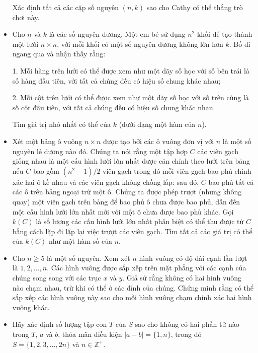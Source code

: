 \documentclass[11pt]{scrartcl}
\begin{document}
\begin{itemize}[label=, leftmargin=0em, itemsep=-0em]
\begin{btvn}
        Xác định tất cả các cặp số nguyên \( (n,k) \) sao cho Cathy có thể thắng trò chơi này.

    \end{btvn}
    \item \begin{btvn}
        Cho \( n \) và \( k \) là các số nguyên dương. Một em bé sử dụng \( n^2 \) khối để tạo thành một lưới \( n \times n \), với mỗi khối có một số nguyên dương không lớn hơn \( k \). Bố đi ngang qua và nhận thấy rằng:

        1. Mỗi hàng trên lưới có thể được xem như một dãy số học với số bên trái là số hàng đầu tiên, với tất cả chúng đều có hiệu số chung khác nhau;
        
        2. Mỗi cột trên lưới có thể được xem như một dãy số học với số trên cùng là số cột đầu tiên, với tất cả chúng đều có hiệu số chung khác nhau.

        Tìm giá trị nhỏ nhất có thể của \( k \) (dưới dạng một hàm của \( n \)).

    \end{btvn}
    \item \begin{btvn}
        Xét một bảng ô vuông $n \times n$ được tạo bởi các ô vuông đơn vị với $n$ là một số nguyên lẻ dương nào đó. Chúng ta nói rằng một tập hợp $C$ các viên gạch giống nhau là một cấu hình lưới lớn nhất được căn chỉnh theo lưới trên bảng nếu $C$ bao gồm $(n^2-1)/2$ viên gạch trong đó mỗi viên gạch bao phủ chính xác hai ô kề nhau và các viên gạch không chồng lấp: sau đó, $C$ bao phủ tất cả các ô trên bảng ngoại trừ một ô. Chúng ta được phép trượt (nhưng không quay) một viên gạch trên bảng để bao phủ ô chưa được bao phủ, dẫn đến một cấu hình lưới lớn nhất mới với một ô chưa được bao phủ khác. Gọi $k(C)$ là số lượng các cấu hình lưới lớn nhất phân biệt có thể thu được từ $C$ bằng cách lặp đi lặp lại việc trượt các viên gạch. Tìm tất cả các giá trị có thể của $k(C)$ như một hàm số của $n$.
    \end{btvn}
    \item \begin{btvn}
        Cho $n \geq 5$ là một số nguyên. Xem xét $n$ hình vuông có độ dài cạnh lần lượt là $1, 2, \dots , n$. Các hình vuông được sắp xếp trên mặt phẳng với các cạnh của chúng song song với các trục $x$ và $y$. Giả sử rằng không có hai hình vuông nào chạm nhau, trừ khi có thể ở các đỉnh của chúng. Chứng minh rằng có thể sắp xếp các hình vuông này sao cho mỗi hình vuông chạm chính xác hai hình vuông khác.
    \end{btvn}
    \item \begin{btvn}
        Hãy xác định số lượng tập con $T$ của $S$ sao cho không có hai phần tử nào trong $T$, $a$ và $b$, thỏa mãn điều kiện $|a-b|=\{1,n\}$, trong đó $S =\{1,2,3, \ldots, 2n\}$ và $n \in \mathbb{Z}^+$.
    \end{btvn}


\end{itemize}
\end{document}
